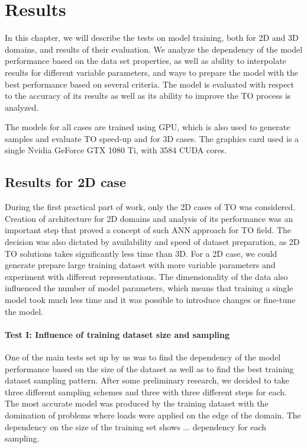 
\chapter{Results}
\label{chapter:Results}

In this chapter, we will describe the tests on model training, both for 2D and 3D domains, and results of their evaluation.
We analyze the dependency of the model performance based on the data set properties, as well as ability to interpolate results for different variable parameters, and ways to prepare the model with the best performance based on several criteria. 
The model is evaluated with respect to the accuracy of its results as well as its ability to improve the TO process is analyzed.
\medskip

The models for all cases are trained using GPU, which is also used to generate samples and evaluate TO speed-up and for 3D cases.
The graphics card used is a single Nvidia GeForce GTX 1080 Ti, with 3584 CUDA cores. 


\section{Results for 2D case}

During the first practical part of work, only the 2D cases of TO was considered.
Creation of architecture for 2D domains and analysis of its performance was an important step that proved a concept of such ANN approach for TO field.
The decision was also dictated by availability and speed of dataset preparation, as 2D TO solutions takes significantly less time than 3D. 
For a 2D case, we could generate prepare large training dataset with more variable parameters and experiment with different representations.
The dimensionality of the data also influenced the number of model parameters, which means that training a single model took much less time and it was possible to introduce changes or fine-tune the model.

\medskip

\subsubsection{Test I: Influence of training dataset size and sampling}
One of the main tests set up by us was to find the dependency of the model performance based on the size of the dataset as well as to find the best training dataset sampling pattern.
After some preliminary research, we decided to take three different sampling schemes and three with three different steps for each. 
The most accurate model was produced by the training dataset with the domination of problems where loads were applied on the edge of the domain.
The dependency on the size of the training set shows ...  dependency for each sampling.
\medskip

